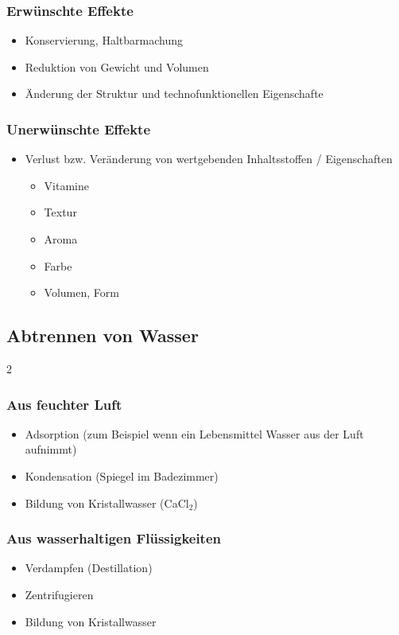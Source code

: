 \documentclass[a4paper,10pt]{article}
\begin{document}
\subsubsection{Erwünschte Effekte}
\begin{itemize}
\item Konservierung, Haltbarmachung
\item Reduktion von Gewicht und Volumen
\item Änderung der Struktur und technofunktionellen Eigenschafte
\end{itemize}

\subsubsection{Unerwünschte Effekte}
\begin{itemize}
\item Verlust bzw. Veränderung von wertgebenden Inhaltsstoffen / Eigenschaften
\begin{itemize}
\item Vitamine
\item Textur
\item Aroma
\item Farbe
\item Volumen, Form
\end{itemize}
\end{itemize}

\subsection{Abtrennen von Wasser}

\begin{multicols}{2}

\subsubsection{Aus feuchter Luft}
\begin{itemize}
\item Adsorption (zum Beispiel wenn ein Lebensmittel Wasser aus der Luft aufnimmt)
\item Kondensation (Spiegel im Badezimmer)
\item Bildung von Kristallwasser (CaCl$_2$)
\end{itemize}

\columnbreak
\subsubsection{Aus wasserhaltigen Flüssigkeiten}
\begin{itemize}
\item Verdampfen (Destillation)
\item Zentrifugieren
\item Bildung von Kristallwasser
\end{itemize}
\end{multicols}
\end{document}
